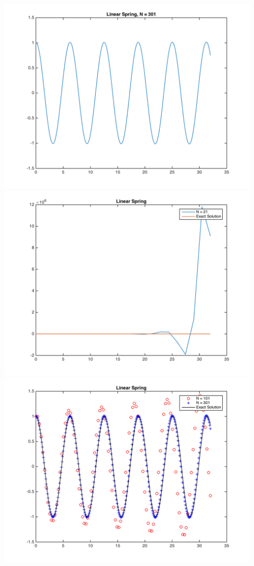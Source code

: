 \documentclass[11pt, oneside]{article}
\begin{document}
\begin{enumerate}
\begin{center}
      \includegraphics[scale=.4]{Figures/01_17.png}
      \includegraphics[scale=.4]{Figures/01_18.png}
      \includegraphics[scale=.7]{Figures/01_19.png}
    \end{center}


\end{enumerate}
\end{document}
